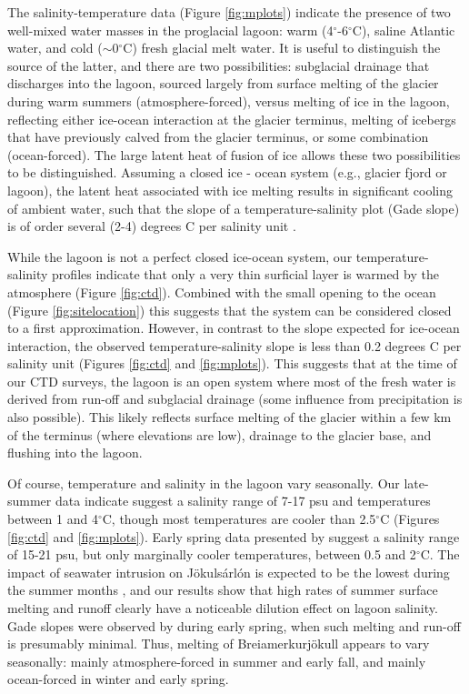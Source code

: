 The salinity-temperature data (Figure \ref{fig:mplots}) indicate the presence of two well-mixed water masses in the proglacial lagoon: warm (4$^{\circ}$-6$^{\circ}$C), saline Atlantic water, and cold ($\sim$0$^{\circ}$C) fresh glacial melt water.  It is useful to distinguish the source of the latter, and there are two possibilities: subglacial drainage that discharges into the lagoon, sourced largely from surface melting of the glacier during warm summers (atmosphere-forced), versus melting of ice in the lagoon, reflecting either ice-ocean interaction at the glacier terminus, melting of icebergs that have previously calved from the glacier terminus, or some combination (ocean-forced).  The large latent heat of fusion of ice allows these two possibilities to be distinguished.  Assuming a closed ice - ocean system (e.g., glacier fjord or lagoon), the latent heat associated with ice melting results in significant cooling of ambient water, such that the slope of a temperature-salinity plot (Gade slope) is of order several (2-4) degrees C per salinity unit \citep{gade1979,
jenkins1999impact, mortensen2013}.  

While the lagoon is not a perfect closed ice-ocean system, our temperature-salinity profiles indicate that only a very thin surficial layer is warmed by the atmosphere (Figure \ref{fig:ctd}). Combined with the small opening to the ocean (Figure \ref{fig:sitelocation}) this suggests that the system can be considered closed to a first approximation.  However, in contrast to the slope expected for ice-ocean interaction, the observed temperature-salinity slope is less than 0.2 degrees C per salinity unit (Figures \ref{fig:ctd} and \ref{fig:mplots}).  This suggests that at the time of our CTD surveys, the lagoon is an open system where most of the fresh water is derived from run-off and subglacial drainage (some influence from precipitation is also possible). This likely reflects surface melting of the glacier within a few km of the terminus (where elevations are low), drainage to the glacier base, and flushing into the lagoon. 

Of course, temperature and salinity in the lagoon vary seasonally.  Our late-summer data indicate suggest a salinity range of 7-17 psu and temperatures between 1 and 4$^{\circ}$C, though most temperatures are cooler than 2.5$^{\circ}$C (Figures \ref{fig:ctd} and \ref{fig:mplots}).  Early spring data presented by \citet{brandon2013hydrographic} suggest a salinity range of 15-21 psu, but only marginally cooler temperatures, between 0.5 and 2$^{\circ}$C.   The impact of seawater intrusion on Jökulsárlón is expected to be the lowest during the summer months \citep{landl2003energy}, and our results show that high rates of summer surface melting and runoff clearly have a noticeable dilution effect on lagoon salinity.  Gade slopes were observed by \citet{brandon2013hydrographic} during early spring, when such melting and run-off is presumably minimal.  Thus, melting of Brei{\dh}amerkurjökull appears to vary seasonally: mainly atmosphere-forced in summer and early fall, and mainly ocean-forced in winter and early spring. 


